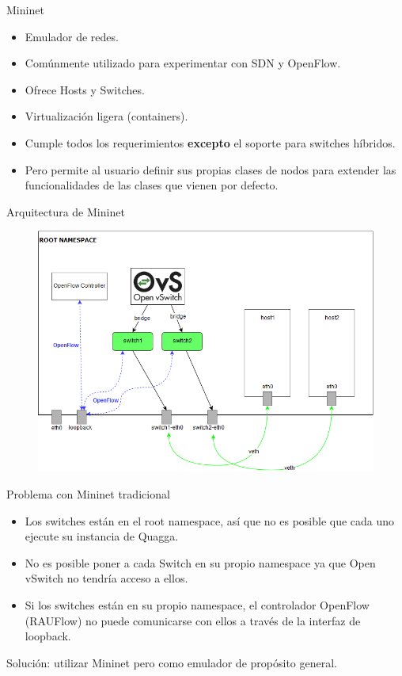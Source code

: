 \documentclass[xcolor=svgnames]{beamer}
\begin{document}
\begin{frame}{Mininet}
	\begin{itemize}
		\item Emulador de redes.
		\item Comúnmente utilizado para experimentar con SDN y OpenFlow.
		\item Ofrece Hosts y Switches.
		\item Virtualización ligera (containers).
		\item Cumple todos los requerimientos \textbf{excepto} el soporte para switches híbridos.
		\item Pero permite al usuario definir sus propias clases de nodos para extender las funcionalidades de las clases que vienen por defecto.
	\end{itemize}
\end{frame}

\begin{frame}{Arquitectura de Mininet}
	\begin{figure}[t]
		\centering
		\includegraphics[scale=0.5]{mininet_architecture}
	\end{figure}
\end{frame}

\begin{frame}{Problema con Mininet tradicional}
	\begin{itemize}
		\item Los switches están en el root namespace, así que no es posible que cada uno ejecute su instancia de Quagga.
		\item No es posible poner a cada Switch en su propio namespace ya que Open vSwitch no tendría acceso a ellos.
		\item Si los switches están en su propio namespace, el controlador OpenFlow (RAUFlow) no puede comunicarse con ellos a través de la interfaz de loopback.
	\end{itemize}
	\pause
	{\color{teal}Solución: utilizar Mininet pero como emulador de propósito general.}
\end{frame}
\end{document}
